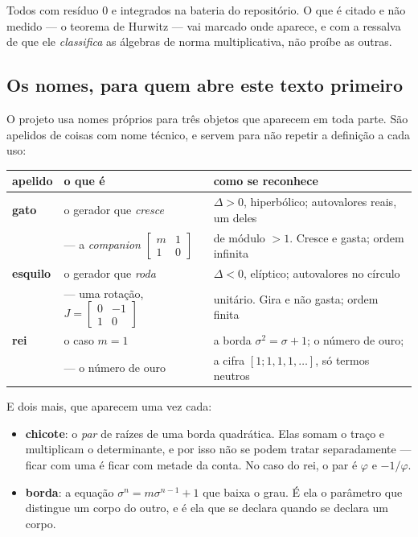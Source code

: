 \documentclass[11pt]{article}
\theoremstyle{plain}
\theoremstyle{remark}
\begin{document}
\noindent Todos com resíduo $0$ e integrados na bateria do repositório. O que é citado e não
medido --- o teorema de Hurwitz --- vai marcado onde aparece, e com a ressalva de que ele
\emph{classifica} as álgebras de norma multiplicativa, não proíbe as outras.

\appendix
\subsection{Os nomes, para quem abre este texto primeiro}

O projeto usa nomes próprios para três objetos que aparecem em toda parte. São apelidos de coisas
com nome técnico, e servem para não repetir a definição a cada uso:

\begin{center}
\begin{tabular}{lll}
\toprule
\textbf{apelido} & \textbf{o que é} & \textbf{como se reconhece} \\
\midrule
\textbf{gato} & o gerador que \emph{cresce} & $\Delta>0$, hiperbólico; autovalores reais, um deles \\
 & --- a \emph{companion} $\left[\begin{smallmatrix}m&1\\1&0\end{smallmatrix}\right]$
 & de módulo $>1$. Cresce e gasta; ordem infinita \\[3pt]
\textbf{esquilo} & o gerador que \emph{roda} & $\Delta<0$, elíptico; autovalores no círculo \\
 & --- uma rotação, $J=\left[\begin{smallmatrix}0&-1\\1&0\end{smallmatrix}\right]$
 & unitário. Gira e não gasta; ordem finita \\[3pt]
\textbf{rei} & o caso $m=1$ & a borda $\sigma^2=\sigma+1$; o número de ouro; \\
 & --- o número de ouro & a cifra $[1;1,1,1,\dots]$, só termos neutros \\
\bottomrule
\end{tabular}
\end{center}

\noindent E dois mais, que aparecem uma vez cada:

\begin{itemize}
\item \textbf{chicote}: o \emph{par} de raízes de uma borda quadrática. Elas somam o traço e
multiplicam o determinante, e por isso não se podem tratar separadamente --- ficar com uma é ficar
com metade da conta. No caso do rei, o par é $\varphi$ e $-1/\varphi$.
\item \textbf{borda}: a equação $\sigma^n=m\sigma^{n-1}+1$ que baixa o grau. É ela o parâmetro
que distingue um corpo do outro, e é ela que se declara quando se declara um corpo.
\end{itemize}
\end{document}
